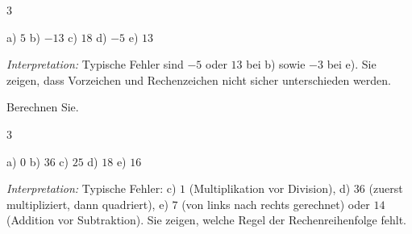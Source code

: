 \documentclass[11pt]{exam}
\newcommand{\aufgabe}[1]{%
  \needspace{8\baselineskip}%
  \renewcommand{\questionlabel}{\textbf{#1}}%
  \question}
\newcommand{\geteilt}{\mathbin{:}}
\newcommand{\raum}[1]{\ifprintanswers\else\fillwithgrid{#1}\fi}
\newcommand{\diagnose}[1]{\par\smallskip\textit{Interpretation:} #1}
\begin{document}
\begin{questions}
\begin{multicols}{3}
\end{multicols}
\begin{solution}
  a) $5$ \quad b) $-13$ \quad c) $18$ \quad d) $-5$ \quad e) $13$
  \diagnose{Typische Fehler sind $-5$ oder $13$ bei b) sowie $-3$ bei e). Sie
  zeigen, dass Vorzeichen und Rechenzeichen nicht sicher unterschieden werden.}
\end{solution}
\raum{2.5cm}

\aufgabe{2.4}
Berechnen Sie.
\begin{multicols}{3}
\end{multicols}
\begin{solution}
  a) $0$ \quad b) $36$ \quad c) $25$ \quad d) $18$ \quad e) $16$
  \diagnose{Typische Fehler: c) $1$ (Multiplikation vor Division), d) $36$
  (zuerst multipliziert, dann quadriert), e) $7$ (von links nach rechts
  gerechnet) oder $14$ (Addition vor Subtraktion). Sie zeigen, welche Regel der
  Rechenreihenfolge fehlt.}
\end{solution}
\raum{3cm}


\end{questions}
\end{document}
